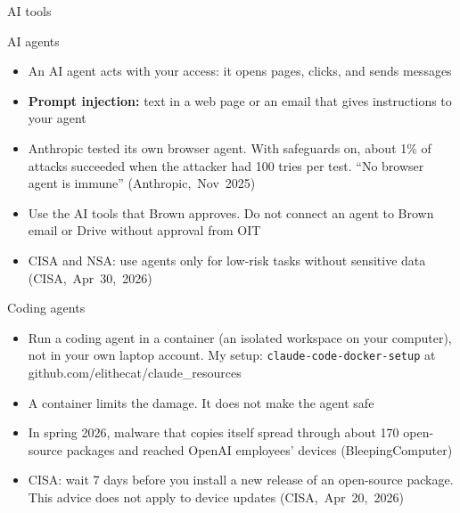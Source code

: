 \documentclass[11pt]{beamer}
\newcommand{\srccite}[1]{{\scriptsize\textcolor{citecol}{#1}}}
\newcommand{\vfy}{\unskip}
\newcommand{\vfy}{\unskip\nobreakspace{\scriptsize\textcolor{citecol}{[verify]}}}
\renewcommand{\srccite}[1]{{\scriptsize\textcolor{citecol}{\mbox{#1}}}}
\begin{document}
\begin{transition}{}{AI tools}
\end{transition}


\begin{frame}{AI agents}
\pause
\begin{itemize}\setlength\itemsep{8pt}
\item An AI agent acts with your access: it opens pages, clicks, and sends messages \pause
\item \textbf{Prompt injection:} text in a web page or an email that gives instructions to your agent \pause
\item Anthropic tested its own browser agent. With safeguards on, about 1\% of attacks succeeded when the attacker had 100 tries per test. ``No browser agent is immune'' \srccite{(Anthropic, Nov 2025)} \pause
\item Use the AI tools that Brown approves. Do not connect an agent to Brown email or Drive without approval from OIT \pause
\item CISA and NSA: use agents only for low-risk tasks without sensitive data \srccite{(CISA, Apr 30, 2026)} \vfy
\end{itemize}
\end{frame}


\begin{frame}{Coding agents}
\pause
\begin{itemize}\setlength\itemsep{8pt}
\item Run a coding agent in a container (an isolated workspace on your computer), not in your own laptop account. My setup: \texttt{claude-code-docker-setup} at github.com/elithecat/claude\_resources \pause
\item A container limits the damage. It does not make the agent safe \pause
\item In spring 2026, malware that copies itself spread through about 170 open-source packages and reached OpenAI employees' devices \srccite{(BleepingComputer)} \vfy \pause
\item CISA: wait 7 days before you install a new release of an open-source package. This advice does not apply to device updates \srccite{(CISA, Apr 20, 2026)} \vfy
\end{itemize}
\end{frame}
\end{document}
